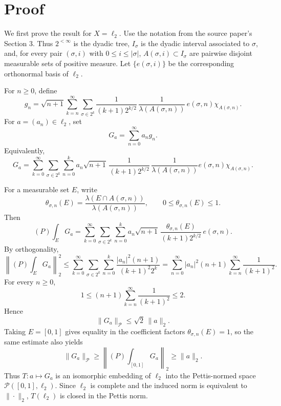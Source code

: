 \documentclass[11pt]{article}
\newcommand{\Pettis}{\mathcal P}
\begin{document}
\section*{Proof}

We first prove the result for \(X=\ell_2\).  Use the notation from the source
paper's Section 3.  Thus \(2^{<\infty}\) is the dyadic tree, \(I_\sigma\) is
the dyadic interval associated to \(\sigma\), and, for every pair
\((\sigma,i)\) with \(0\le i\le |\sigma|\), \(A(\sigma,i)\subset I_\sigma\)
are pairwise disjoint measurable sets of positive measure.  Let
\(\{e(\sigma,i)\}\) be the corresponding orthonormal basis of \(\ell_2\).

For \(n\ge0\), define
\[
g_n
=
\sqrt{n+1}
\sum_{k=n}^{\infty}
\sum_{\sigma\in 2^k}
 \frac{1}{(k+1)2^{k/2}}\,
 \frac{1}{\lambda(A(\sigma,n))}\,
 e(\sigma,n)\chi_{A(\sigma,n)} .
\]
For \(a=(a_n)\in\ell_2\), set
\[
G_a=\sum_{n=0}^{\infty} a_n g_n.
\]
Equivalently,
\[
G_a=
\sum_{k=0}^{\infty}\sum_{\sigma\in2^k}\sum_{n=0}^{k}
a_n\sqrt{n+1}\,
\frac{1}{(k+1)2^{k/2}}\,
\frac{1}{\lambda(A(\sigma,n))}
e(\sigma,n)\chi_{A(\sigma,n)} .
\]

For a measurable set \(E\), write
\[
\theta_{\sigma,n}(E)=
\frac{\lambda(E\cap A(\sigma,n))}{\lambda(A(\sigma,n))},
\qquad 0\le \theta_{\sigma,n}(E)\le1.
\]
Then
\[
(P)\int_E G_a
=
\sum_{k=0}^{\infty}\sum_{\sigma\in2^k}\sum_{n=0}^{k}
a_n\sqrt{n+1}\,
\frac{\theta_{\sigma,n}(E)}{(k+1)2^{k/2}}\,
e(\sigma,n).
\]
By orthogonality,
\[
\left\|(P)\int_E G_a\right\|_2^2
\le
\sum_{k=0}^{\infty}\sum_{\sigma\in2^k}\sum_{n=0}^{k}
\frac{|a_n|^2(n+1)}{(k+1)^2 2^k}
=
\sum_{n=0}^{\infty}|a_n|^2(n+1)
\sum_{k=n}^{\infty}\frac1{(k+1)^2}.
\]
For every \(n\ge0\),
\[
1
\le
(n+1)\sum_{k=n}^{\infty}\frac1{(k+1)^2}
\le
2.
\]
Hence
\[
\|G_a\|_{\Pettis}\le \sqrt2\,\|a\|_2.
\]
Taking \(E=[0,1]\) gives equality in the coefficient factors
\(\theta_{\sigma,n}(E)=1\), so the same estimate also yields
\[
\|G_a\|_{\Pettis}\ge \left\|(P)\int_{[0,1]}G_a\right\|_2
\ge \|a\|_2.
\]
Thus \(T\colon a\mapsto G_a\) is an isomorphic embedding of \(\ell_2\) into
the Pettis-normed space \(\Pettis([0,1],\ell_2)\).  Since \(\ell_2\) is
complete and the induced norm is equivalent to \(\|\cdot\|_2\), \(T(\ell_2)\)
is closed in the Pettis norm.
\end{document}
